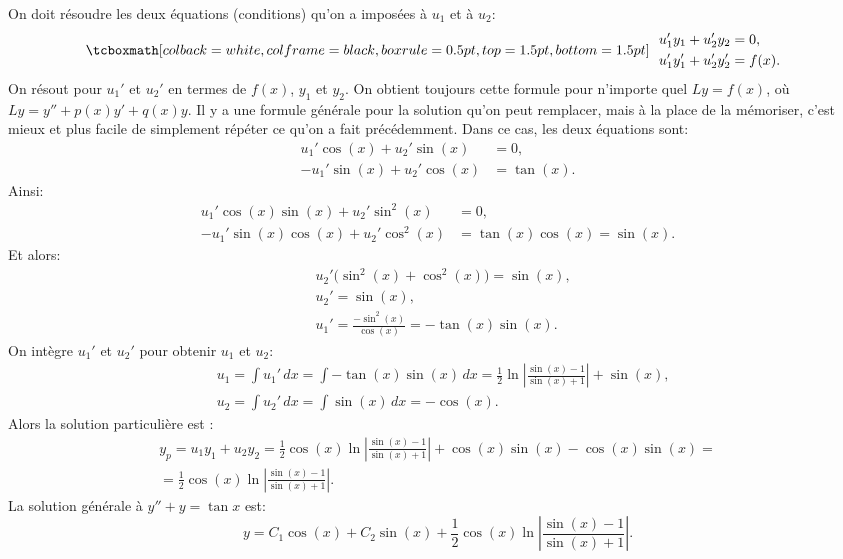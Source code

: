 On doit résoudre les deux équations (conditions) qu'on a imposées à  $u_1$ et à $u_2$:
\begin{equation*}
\mybxbg{~~ \begin{aligned}
				& u_1' y_1 + u_2' y_2 = 0 ,\\
				& u_1' y_1' + u_2' y_2' = f(x) .
		\end{aligned}~~}
\end{equation*}
On résout pour $u_1'$ et $u_2'$ en termes de $f(x)$, $y_1$ et $y_2$.
On obtient toujours cette formule pour n'importe quel $Ly = f(x)$, où $Ly = y''+p(x)y'+q(x)y$.  
Il y a une formule générale pour la solution qu'on peut remplacer, mais à la place de la mémoriser, c'est mieux et plus facile de simplement répéter ce qu'on a fait précédemment. Dans ce cas, les deux équations sont:  
\begin{align*}
	 u_1' \cos (x) + u_2' \sin (x) &= 0 ,\\
	-u_1' \sin (x) + u_2' \cos (x) &= \tan (x) .
\end{align*}
Ainsi: 
\begin{align*}
	 u_1' \cos (x) \sin (x) + u_2' \sin^2 (x) & = 0 ,\\
	-u_1' \sin (x) \cos (x) + u_2' \cos^2 (x) & = \tan (x) \cos (x) = \sin (x) .
\end{align*}
Et alors: 
\begin{align*}
	& u_2' \bigl(\sin^2 (x) + \cos^2 (x)\bigr) = \sin (x) , \\
	& u_2' = \sin (x) , \\
	& u_1' = \frac{- \sin^2 (x)}{\cos (x)} = - \tan (x) \sin (x) .
\end{align*}
On intègre $u_1'$ et $u_2'$ pour obtenir $u_1$ et $u_2$: 
\begin{align*}
	& u_1 = \int u_1'\,dx 	= \int - \tan (x) \sin (x)\,dx 
		= \frac{1}{2} \ln \left\lvert \frac{\sin (x)-1}{\sin (x) + 1} \right\rvert 	+ \sin (x) , \\
	& u_2 = \int u_2'\,dx 	= \int \sin (x)\,dx = -\cos (x) .
\end{align*}
Alors la solution particulière est : 
\begin{multline*}
	y_p = u_1 y_1 + u_2 y_2 =
	\frac12 \cos (x) \ln \left\lvert \frac{\sin (x)-1}{\sin (x) + 1}	\right\rvert
	+ \cos (x) \sin (x) -\cos (x) \sin (x)
	= \\ = 	\frac12 \cos (x) \ln \left\lvert \frac{\sin (x)-1}{\sin (x) + 1} \right\rvert .
\end{multline*}
La solution générale à  $y'' + y = \tan x$ est: 
\begin{equation*}
	y = C_1 \cos (x) + C_2 \sin (x) + \frac{1}{2} \cos (x) \ln \left\lvert \frac{\sin (x)-1}{\sin (x) + 1}
\right\rvert .
\end{equation*}

